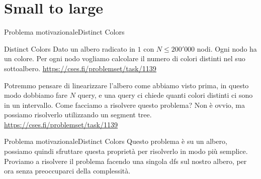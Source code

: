 \documentclass[compress]{beamer}
\begin{document}
\section{Small to large}
\begin{frame}{Problema motivazionale}{Distinct Colors}
    \begin{exampleblock}{Distinct Colors}
        Dato un albero radicato in $1$ con $N \leq 200'000$ nodi. Ogni nodo ha un colore. Per ogni nodo vogliamo 
        calcolare il numero di colori distinti nel suo sottoalbero.
    \small{\underline{\url{https://cses.fi/problemset/task/1139}}}
    \end{exampleblock}
    Potremmo pensare di linearizzare l'albero come abbiamo visto prima, in questo modo dobbiamo fare $N$ query, e 
    una query ci chiede quanti colori distinti ci sono in un intervallo.
    \pause
    Come facciamo a risolvere questo problema? Non è ovvio, ma possiamo risolverlo utilizzando un segment tree.
    \small{\underline{\url{https://cses.fi/problemset/task/1139}}}
\end{frame}

\begin{frame}{Problema motivazionale}{Distinct Colors}
    Questo problema è su un albero, possiamo quindi sfruttare questa proprietà per risolverlo in modo più semplice.\\
    \pause
    Proviamo a risolvere il problema facendo una singola dfs sul nostro albero, per ora senza preoccuparci della complessit\`a.
    \pause
\end{frame}
\end{document}
